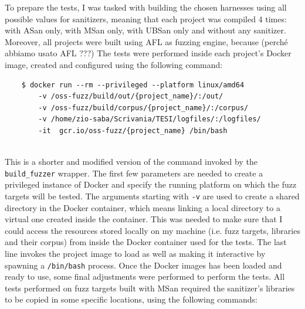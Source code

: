 \newpage
To prepare the tests, I was tasked with building the chosen harnesses using all possible values for sanitizers, meaning that each project was compiled 4 times: with ASan only, with MSan only, with UBSan only and without any sanitizer.
\newline
Moreover, all projects were built using AFL as fuzzing engine, because (perché abbiamo usato AFL ???) 
\newline \newline
The tests were performed inside each project's Docker image, created and configured using the following command:
\begin{verbatim}
    $ docker run --rm --privileged --platform linux/amd64 
        -v /oss-fuzz/build/out/{project_name}/:/out/
        -v /oss-fuzz/build/corpus/{project_name}/:/corpus/    
        -v /home/zio-saba/Scrivania/TESI/logfiles/:/logfiles/ 
        -it  gcr.io/oss-fuzz/{project_name} /bin/bash
\end{verbatim}
\ \\
This is a shorter and modified version of the command invoked by the \verb|build_fuzzer| wrapper.
\newline \newline
The first few parameters are needed to create a privileged instance of Docker and specify the running platform on which the fuzz targets will be tested.
\newline \newline
The arguments starting with \verb|-v| are used to create a shared directory in the Docker container, which means linking a local directory to a virtual one created inside the container. This was needed to make sure that I could access the resources stored locally on my machine (i.e. fuzz targets, libraries and their corpus) from inside the Docker container used for the tests.
\newline \newline
The last line invokes the project image to load as well as making it interactive by spawning a \verb|/bin/bash| process.
\newline \newline \newline \newline
Once the Docker images has been loaded and ready to use, some final adjustments were performed to perform the tests.
\newline \newline
All tests performed on fuzz targets built with MSan required the sanitizer's libraries to be copied in some specific locations, using the following commands:
